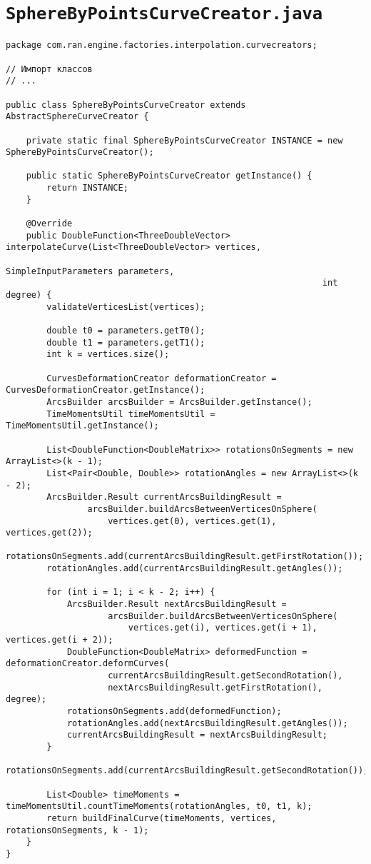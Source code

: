 \section*{\texttt{SphereByPointsCurveCreator.java}}
\begin{verbatim}
package com.ran.engine.factories.interpolation.curvecreators;

// Импорт классов
// ...

public class SphereByPointsCurveCreator extends AbstractSphereCurveCreator {

    private static final SphereByPointsCurveCreator INSTANCE = new SphereByPointsCurveCreator();

    public static SphereByPointsCurveCreator getInstance() {
        return INSTANCE;
    }

    @Override
    public DoubleFunction<ThreeDoubleVector> interpolateCurve(List<ThreeDoubleVector> vertices,
                                                              SimpleInputParameters parameters,
                                                              int degree) {
        validateVerticesList(vertices);

        double t0 = parameters.getT0();
        double t1 = parameters.getT1();
        int k = vertices.size();

        CurvesDeformationCreator deformationCreator = CurvesDeformationCreator.getInstance();
        ArcsBuilder arcsBuilder = ArcsBuilder.getInstance();
        TimeMomentsUtil timeMomentsUtil = TimeMomentsUtil.getInstance();

        List<DoubleFunction<DoubleMatrix>> rotationsOnSegments = new ArrayList<>(k - 1);
        List<Pair<Double, Double>> rotationAngles = new ArrayList<>(k - 2);
        ArcsBuilder.Result currentArcsBuildingResult =
                arcsBuilder.buildArcsBetweenVerticesOnSphere(
                    vertices.get(0), vertices.get(1), vertices.get(2));
        rotationsOnSegments.add(currentArcsBuildingResult.getFirstRotation());
        rotationAngles.add(currentArcsBuildingResult.getAngles());

        for (int i = 1; i < k - 2; i++) {
            ArcsBuilder.Result nextArcsBuildingResult =
                    arcsBuilder.buildArcsBetweenVerticesOnSphere(
                        vertices.get(i), vertices.get(i + 1), vertices.get(i + 2));
            DoubleFunction<DoubleMatrix> deformedFunction = deformationCreator.deformCurves(
                    currentArcsBuildingResult.getSecondRotation(),
                    nextArcsBuildingResult.getFirstRotation(), degree);
            rotationsOnSegments.add(deformedFunction);
            rotationAngles.add(nextArcsBuildingResult.getAngles());
            currentArcsBuildingResult = nextArcsBuildingResult;
        }
        rotationsOnSegments.add(currentArcsBuildingResult.getSecondRotation());

        List<Double> timeMoments = timeMomentsUtil.countTimeMoments(rotationAngles, t0, t1, k);
        return buildFinalCurve(timeMoments, vertices, rotationsOnSegments, k - 1);
    }
}
\end{verbatim}

